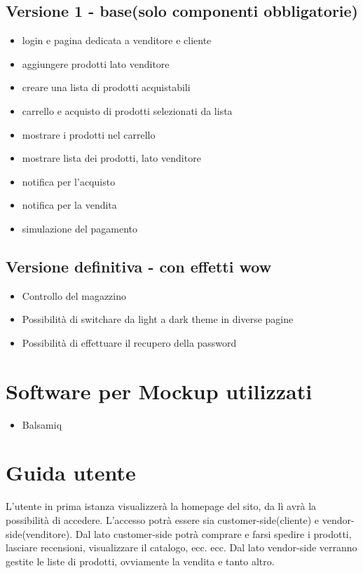\documentclass[a4paper,12pt]{report}
\begin{document}
	\subsection{Versione 1 - base(solo componenti obbligatorie)}
	\begin{itemize}
		\item login e pagina dedicata a venditore e cliente
		\item aggiungere prodotti lato venditore
		\item creare una lista di prodotti acquistabili
		\item carrello e acquisto di prodotti selezionati da lista
		\item mostrare i prodotti nel carrello
		\item mostrare lista dei prodotti, lato venditore
		\item notifica per l'acquisto
		\item notifica per la vendita
		\item simulazione del pagamento
	\end{itemize}

	\subsection{Versione definitiva - con effetti wow}
	\begin{itemize}
		\item Controllo del magazzino
		\item Possibilità di switchare da light a dark theme in diverse pagine
		\item Possibilità di effettuare il recupero della password
	\end{itemize}

	\section{Software per Mockup utilizzati}
	
	\begin{itemize}
		\item Balsamiq
	\end{itemize}

	
	\newpage

	\section{Guida utente}
	L'utente in prima istanza visualizzerà la homepage del sito, da lì avrà la possibilità di accedere.
	L'accesso potrà essere sia customer-side(cliente) e vendor-side(venditore).
	Dal lato customer-side potrà comprare e farsi spedire i prodotti, lasciare recensioni, visualizzare il catalogo, ecc. ecc.
	Dal lato vendor-side verranno gestite le liste di prodotti, ovviamente la vendita e tanto altro.\\
	
\end{document}

